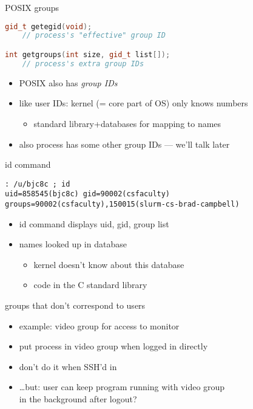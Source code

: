 \begin{frame}[fragile,label=posixGRoups]{POSIX groups}
\begin{lstlisting}[language=C++,style=small]
gid_t getegid(void);
    // process's "effective" group ID

int getgroups(int size, gid_t list[]);
    // process's extra group IDs
\end{lstlisting}
    \begin{itemize}
    \item POSIX also has \textit{group IDs}
    \item like user IDs: kernel (= core part of OS) only knows numbers
        \begin{itemize}
        \item standard library+databases for mapping to names
        \end{itemize}
    \item {\small also process has some other group IDs --- we'll talk later}
    \end{itemize}
\end{frame}

\begin{frame}[fragile,label=idCommand]{id command}
\begin{lstlisting}[language={},style=small]
: /u/bjc8c ; id
uid=858545(bjc8c) gid=90002(csfaculty)
groups=90002(csfaculty),150015(slurm-cs-brad-campbell)
\end{lstlisting}
\vspace{.5cm}
\begin{itemize}
\item id command displays uid, gid, group list
\item names looked up in database
    \begin{itemize}
    \item kernel doesn't know about this database
    \item code in the C standard library
    \end{itemize}
\end{itemize}
\end{frame}

\begin{frame}{groups that don't correspond to users}
    \begin{itemize}
    \item example: video group for access to monitor
    \vspace{.5cm}
    \item put process in video group when logged in directly
    \item don't do it when SSH'd in
    \vspace{.5cm}
    \item<2-> \ldots but: user can keep program running with video group \\ in the background after logout?
    \end{itemize}
\end{frame}
